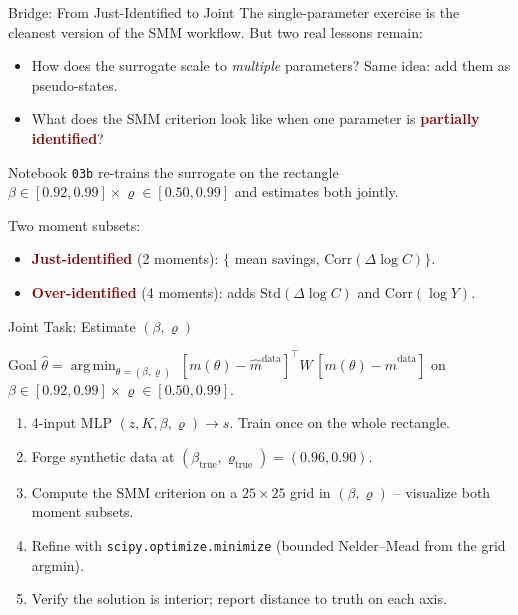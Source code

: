 \documentclass[10pt,aspectratio=169]{beamer}
\newcommand{\emphc}[1]{\textbf{\textcolor{darkred}{#1}}}
\DeclareMathOperator*{\argmin}{arg\,min}
\begin{document}
\begin{frame}{Bridge: From Just-Identified to Joint}
\small
The single-parameter exercise is the cleanest version of the SMM workflow. But two real lessons remain:
\begin{itemize}
\itemsep1pt
  \item How does the surrogate scale to \emph{multiple} parameters? Same idea: add them as pseudo-states.
  \item What does the SMM criterion look like when one parameter is \emphc{partially identified}?
\end{itemize}
\vspace{0.1cm}
Notebook \texttt{03b} re-trains the surrogate on the rectangle $\beta \in [0.92, 0.99] \times \varrho \in [0.50, 0.99]$ and estimates both jointly.

\vspace{0.2cm}
Two moment subsets:
\begin{itemize}
  \item \emphc{Just-identified} (2 moments): $\{$ mean savings, $\mathrm{Corr}(\Delta\log C)\}$.
  \item \emphc{Over-identified} (4 moments): adds $\mathrm{Std}(\Delta\log C)$ and $\mathrm{Corr}(\log Y)$.
\end{itemize}
\end{frame}

\begin{frame}{Joint Task: Estimate $(\beta, \varrho)$}
\begin{block}{Goal}
$\hat\theta = \argmin_{\theta = (\beta,\varrho)}\; [m(\theta) - \hat{m}^{\mathrm{data}}]^\top W\, [m(\theta) - \hat{m}^{\mathrm{data}}]$ \quad on $\beta\in[0.92,0.99] \times \varrho\in[0.50, 0.99]$.
\end{block}
\begin{enumerate}
  \itemsep1pt
  \item 4-input MLP $(z, K, \beta, \varrho) \to s$. Train once on the whole rectangle.
  \item Forge synthetic data at $(\beta_{\text{true}}, \varrho_{\text{true}}) = (0.96, 0.90)$.
  \item Compute the SMM criterion on a $25\times 25$ grid in $(\beta, \varrho)$ -- visualize both moment subsets.
  \item Refine with \texttt{scipy.optimize.minimize} (bounded Nelder--Mead from the grid argmin).
  \item Verify the solution is interior; report distance to truth on each axis.
\end{enumerate}
\end{frame}
\end{document}
